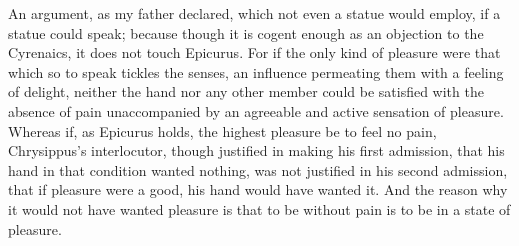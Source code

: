 {An argument, as my father declared, which not even a statue would employ, if a statue could speak; because though it is cogent enough as an objection to the Cyrenaics, it does not touch Epicurus. For if the only kind of pleasure were that which so to speak tickles the senses, an influence permeating them with a feeling of delight, neither the hand nor any other member could be satisfied with the absence of pain unaccompanied by an agreeable and active sensation of pleasure. Whereas if, as Epicurus holds, the highest pleasure be to feel no pain, Chrysippus's interlocutor, though justified in making his first admission, that his hand in that condition wanted nothing, was not justified in his second admission, that if pleasure were a good, his hand would have wanted it.
%
And the reason why it would not have wanted pleasure is that to be without pain is to be in a state of pleasure.

}



